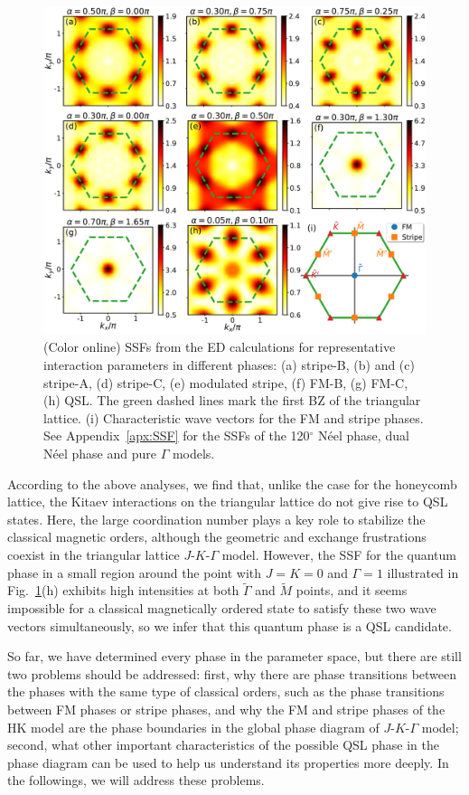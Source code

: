 \documentclass[aps,prb,reprint,amsfonts,amsmath,amssymb,showpacs,groupedaddress,superscriptaddress]{revtex4-1}
\begin{document}
\begin{figure}
    \centering
    \includegraphics[width=\columnwidth]{StructureFactors.pdf}
    \caption{\label{fig:StructureFactors}(Color online) SSFs from the ED calculations for representative interaction parameters in different phases: (a) stripe-B, (b) and (c) stripe-A, (d) stripe-C, (e) modulated stripe, (f) FM-B, (g) FM-C, (h) QSL. The green dashed lines mark the first BZ of the triangular lattice. (i) Characteristic wave vectors for the FM and stripe phases. See Appendix~\ref{apx:SSF} for the SSFs of the 120$^\circ$ N\'{e}el phase, dual N\'{e}el phase and pure $\Gamma$ models.}
\end{figure}

According to the above analyses, we find that, unlike the case for the honeycomb lattice, the Kitaev interactions on the triangular lattice do not give rise to QSL states. Here, the large coordination number plays a key role to stabilize the classical magnetic orders, although the geometric and exchange frustrations coexist in the triangular lattice $J$-$K$-$\Gamma$ model. However, the SSF for the quantum phase in a small region around the point with $J=K=0$ and $\Gamma=1$ illustrated in Fig.~\ref{fig:StructureFactors}(h) exhibits high intensities at both $\tilde{\Gamma}$ and $\tilde{M}$ points, and it seems impossible for a classical magnetically ordered state to satisfy these two wave vectors simultaneously, so we infer that this quantum phase is a QSL candidate.

So far, we have determined every phase in the parameter space, but there are still two problems should be addressed: first, why there are phase transitions between the phases with the same type of classical orders, such as the phase transitions between FM phases or stripe phases, and why the FM and stripe phases of the HK model are the phase boundaries in the global phase diagram of $J$-$K$-$\Gamma$ model; second, what other important characteristics of the possible QSL phase in the phase diagram can be used to help us understand its properties more deeply. In the followings, we will address these problems.
\end{document}
